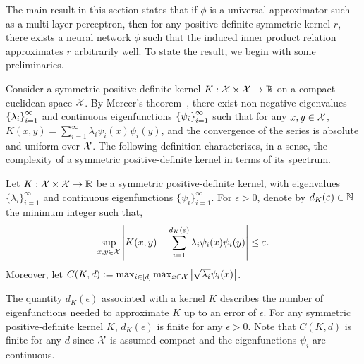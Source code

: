 The main result in this section states that if $\phi$ is a universal approximator such as a multi-layer perceptron, then for any positive-definite symmetric kernel $r$, there exists a neural network $\phi$ such that the induced inner product relation approximates $r$ arbitrarily well. To state the result, we begin with some preliminaries.

 Consider a symmetric positive definite kernel $K: {\mathcal{X}} \times {\mathcal{X}} \to \mathbb{R}$ on a compact euclidean space ${\mathcal{X}}$. By Mercer's theorem~\parencite{mercerFunctionsPositive1909, sunMercerTheorem2005, micchelliUniversalKernels2006}, there exist non-negative eigenvalues $\left\{\lambda_i\right\}_{i=1}^{\infty}$ and continuous eigenfunctions $\left\{\psi_i\right\}_{i=1}^{\infty}$ such that for any $x,y \in {\mathcal{X}}$, $K(x, y) = \sum_{i=1}^\infty \lambda_i \psi_i(x) \psi_i(y)$, and the convergence of the series is absolute and uniform over ${\mathcal{X}}$. The following definition characterizes, in a sense, the complexity of a symmetric positive-definite kernel in terms of its spectrum.

\begin{assumption}\label{ass:sym_pd_ker_specturm_decay}
	Let $K: {\mathcal{X}} \times {\mathcal{X}} \to \mathbb{R}$ be a symmetric positive-definite kernel, with eigenvalues $\{\lambda_i\}_{i=1}^{\infty}$ and continuous eigenfunctions $\{\psi_i\}_{i=1}^{\infty}$. For $\epsilon > 0$, denote by $d_K(\varepsilon) \in \mathbb{N}$ the minimum integer such that,
	\begin{equation*}
		\sup_{x, y \in {\mathcal{X}}} \left\lvert K(x, y) - \sum_{i=1}^{d_K(\varepsilon)} \lambda_i \psi_i(x) \psi_i(y)\right\rvert \leq \varepsilon.
	\end{equation*}
	Moreover, let $C(K, d) := \max_{i \in [d]} \max_{x \in {\mathcal{X}}} \left\lvert\sqrt{\lambda_i} \psi_i(x)\right\rvert$.%
\end{assumption}

The quantity $d_K(\epsilon)$ associated with a kernel $K$ describes the number of eigenfunctions needed to approximate $K$ up to an error of $\epsilon$. For any symmetric positive-definite kernel $K$, $d_K(\epsilon)$ is finite for any $\epsilon > 0$. 
Note that $C(K, d)$ is finite for any $d$ since ${\mathcal{X}}$ is assumed compact and the eigenfunctions $\psi_i$ are continuous. %

